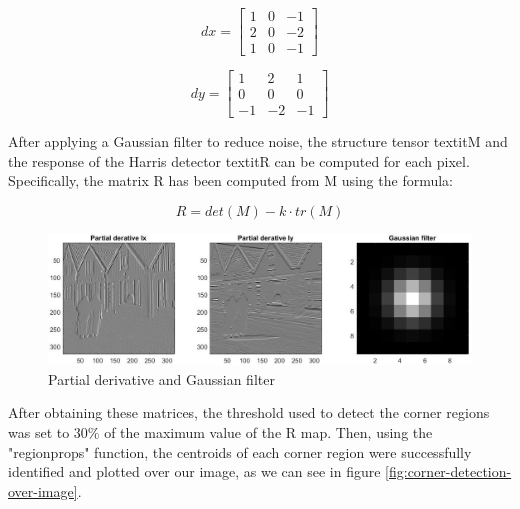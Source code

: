 \begin{minipage}{0.45\textwidth}
	\centering
	\begin{equation}
		dx = \begin{bmatrix}
			1 & 0 & -1 \\
			2 & 0 & -2 \\
			1 & 0 & -1
		\end{bmatrix}
		\label{eq:dx}
	\end{equation}
\end{minipage}
\hfill 
\begin{minipage}{0.45\textwidth}
	\centering
	\begin{equation}
		dy = \begin{bmatrix}
			1 & 2 & 1 \\
			0 & 0 & 0 \\
			-1 & -2 & -1
		\end{bmatrix}
		\label{eq:dy}
	\end{equation}
\end{minipage}

After applying a Gaussian filter to reduce noise, the structure tensor textit{M} and the response of the Harris detector textit{R} can be computed for each pixel. Specifically, the matrix R has been computed from M using the formula:

\begin{equation}
	R = det(M) - k \cdot tr(M)
\end{equation}

\begin{figure}[h]
	\centering
	\includegraphics[width=\linewidth]{"mainmatter/Images/partial derivative and gaussian filter"}
	\caption{Partial derivative and Gaussian filter}
	\label{fig:partial-derivative-and-gaussian-filter}
\end{figure}

After obtaining these matrices, the threshold used to detect the corner regions was set to 30\% of the maximum value of the R map. Then, using the "regionprops" function, the centroids of each corner region were successfully identified and plotted over our image, as we can see in figure \ref{fig:corner-detection-over-image}. 

